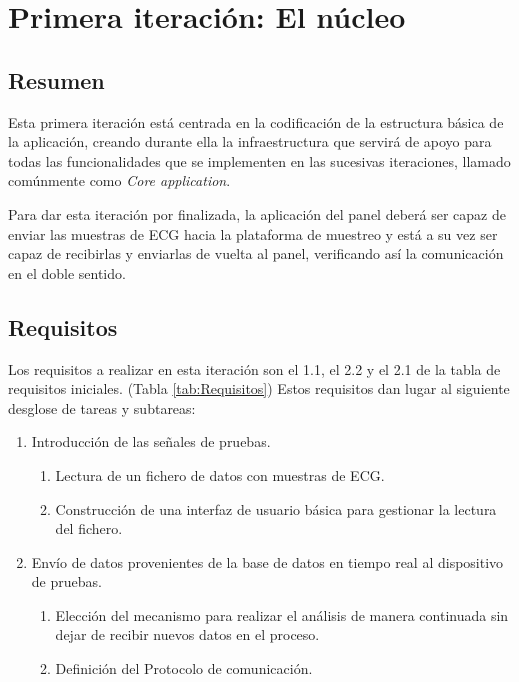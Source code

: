 
\section{Primera iteración: El núcleo}
    \subsection{Resumen}

        Esta primera iteración está centrada en la codificación de la estructura básica de la aplicación, creando durante ella la infraestructura que servirá de apoyo para todas las funcionalidades que se implementen en las sucesivas iteraciones, llamado comúnmente como \textit{Core application}. 

        Para dar esta iteración por finalizada, la aplicación del panel deberá ser capaz de enviar las muestras de ECG hacia la plataforma de muestreo y está a su vez ser capaz de recibirlas y enviarlas de vuelta al panel, verificando así la comunicación en el doble sentido.

    \subsection{Requisitos}

        Los requisitos a realizar en esta iteración son el 1.1, el 2.2 y el 2.1 de la tabla de requisitos iniciales. (Tabla \ref{tab:Requisitos}) Estos requisitos dan lugar al siguiente desglose de tareas y subtareas:

        \begin{enumerate}
                \item Introducción de las señales de pruebas.
                \begin{enumerate}
                        \item Lectura de un fichero de datos con muestras de ECG.
                        \item Construcción de una interfaz de usuario básica para gestionar la lectura del fichero.
                \end{enumerate}
                \item Envío de datos provenientes de la base de datos en tiempo real al dispositivo de pruebas.
                \begin{enumerate}
                        \item Elección del mecanismo para realizar el análisis de manera continuada sin dejar de recibir nuevos datos en el proceso.
                        \item Definición del Protocolo de comunicación.
                \end{enumerate}
        \end{enumerate}

